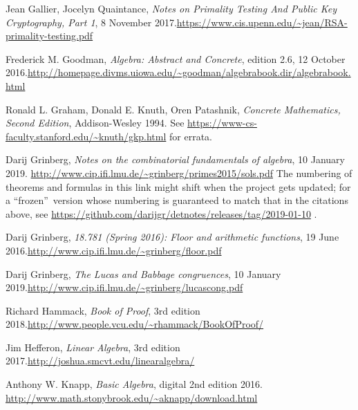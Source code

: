 \documentclass[numbers=enddot,12pt,final,onecolumn,notitlepage]{scrartcl}%
\numberwithin{exer}{subsection}
\theoremstyle{definition}
\begin{document}
\begin{thebibliography}{999999999}
Jean Gallier, Jocelyn Quaintance, \textit{Notes
on Primality Testing And Public Key Cryptography, Part 1}, 8 November
2017.\newline\url{https://www.cis.upenn.edu/~jean/RSA-primality-testing.pdf}

Frederick M. Goodman, \textit{Algebra: Abstract and
Concrete}, edition 2.6, 12 October 2016.\newline\url{http://homepage.divms.uiowa.edu/~goodman/algebrabook.dir/algebrabook.html}

Ronald L. Graham, Donald E. Knuth, Oren Patashnik,
\textit{Concrete Mathematics, Second Edition}, Addison-Wesley 1994.\newline
See \url{https://www-cs-faculty.stanford.edu/~knuth/gkp.html} for errata.

Darij Grinberg, \textit{Notes on the combinatorial
fundamentals of algebra}, 10 January 2019.\newline%
\url{http://www.cip.ifi.lmu.de/~grinberg/primes2015/sols.pdf} \newline The
numbering of theorems and formulas in this link might shift when the project
gets updated; for a \textquotedblleft frozen\textquotedblright\ version whose
numbering is guaranteed to match that in the citations above, see
\url{https://github.com/darijgr/detnotes/releases/tag/2019-01-10} .

Darij Grinberg, \textit{18.781 (Spring 2016): Floor
and arithmetic functions}, 19 June 2016.\newline\url{http://www.cip.ifi.lmu.de/~grinberg/floor.pdf}

Darij Grinberg, \textit{The Lucas and Babbage
congruences}, 10 January 2019.\newline\url{http://www.cip.ifi.lmu.de/~grinberg/lucascong.pdf}

Richard Hammack, \textit{Book of Proof}, 3rd
edition 2018.\newline\url{http://www.people.vcu.edu/~rhammack/BookOfProof/}

Jim Hefferon, \textit{Linear Algebra}, 3rd edition
2017.\newline\url{http://joshua.smcvt.edu/linearalgebra/}

Anthony W. Knapp, \textit{Basic Algebra}, digital
2nd edition 2016. \newline\url{http://www.math.stonybrook.edu/~aknapp/download.html}


\end{thebibliography}
\end{document}
